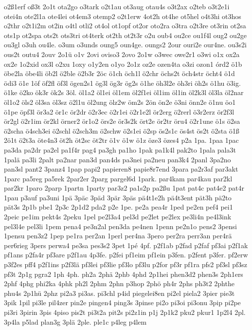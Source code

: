 {o2ß1erf
oß3t
2o1t
ota2go
o3tark
o2t1au
ot3aug
otau4s
o3t2ax
o2teb
o3t2e1i
otei4n
ote2l1a
ote4lei
ot4em3
otemp2
o2t1erw
4ot2h
ot4he
ot5hel
o4t3hi
ot3hos
o2thr
o2t1i2m
ot2in
o4tl
otli2
ot4ol
ot1opf
ot2or
oto2ra
o3tra
o2t3re
ot3rin
ot2sa
ots1p
ot2spa
ots2t
ots3tri
ot4terk
ot2th
ot2t3r
o2u
oub4
ou2ce
ou1f4l
oug2
ou2ge
ou3gl
o3uh
ou4le.
o3um
o3unds
oung5
oun4ge.
oungs2
2our
ouri2e
our4ne.
ou3s2i
ous2t
outu4
2ouv
2o1ü
o1v
2ovi
oviso3
2ovo
2o1w
o3wec
owe2r1
o3wi
o1x
ox2a
ox2e
1o2xid
ox3l
o2xu
1oxy
o1y2en
o1yo
2o1z
oz2e
ozen4ta
o3zi
ozon1
órd2
ö1b
öbe2la
öbe4li
öb2l
ö2ble
ö2b3r
2öc
ö1ch
öch1l
ö2chr
öchs2t
öch4str
öcht4
ö1d
ödi3
ö1e
1öf
öf2fl
öf3l
ögen2s1
ög3l
ög3r
ög2s
ö1he
öh3l2e
öh3ri
öh2s
ö1hu
ö3ig.
ö1ke
ö2ko
ök3r
ök2s
3öl.
öl1a2
öl1ei
öl1em
öl2f1ei
öl1im
öl1in
öl2k3l
öl3la
öl2nar
öl1o2
öls2
öl3sa
öl3sz
ö2l1u
öl2ung
ölz2w
öm2s
2ön
ön2e
ö3ni
önn2e
ö1nu
öo1
ö1pe
öpf3l
ör3a2
ör1c
ör2dr
ö2r3ec
ö2r1ei
ö2r1e2l
ör2erg
ö2rerl
ö3r2erz
ör2f3l
ör2gl
ö2r1im
ör2kl
örner2
ör1o2
örs2e
ör3s2k
ört2e
ör2tr
öru4
ö2r1une
ö1s
ö2sa
ö2scha
ö4sch3ei
ö2schl
ö2sch3m
ö2schw
ö2s1ei
ö2sp
ös2s1c
ös4st
ös2t
ö2sta
ö1ß
2ö1t
ö2t3a
öte4n3
öt2h
öt2sc
öt2tr
ö1v
ö1w
ö1z
öze3
özes4
p2a
1pa.
1paa
1pac
pa3da
pa2dr
pa2el
pa1f4r
pag4
pa3gh
pa1ho
1pak
pa1k4l
pak2to
1pala
pala3t
1palä
pa3li
2palt
pa2nar
pan3d
pan4ds
pa3nei
pa2neu
pan3k4
2panl
3pa2no
pan3sl
pant2
3panz4
1pap
papi2
papieren8
papie8r7end
3para
pa2r3af
par3akt
1parc
pa5reg
pa5rek
2par2er
2parg
pargel6d
1park.
par4kam
par4kau
par2kl
par2kr
1paro
2parp
1partn
1party
par3z2
pa1s2p
pa2ßu
1pat
pat4c
pat4e2
pat4r
1pau
p3auf
pa3uni
1pä
3päc
3päd
3pär
3päs
pä4t1e2h
pä4t3ent
pät3h
pä2to
pät3s
2p1b
pbe1
2p3c
2p1d2
pda2
p2e
1pe.
pe2a
pea4r
1ped
pe2en
pef4
pei1
2peic
pe1im
pekt4s
2peku
1pel
pe2l3a4
pel3d
pe2let
pe2lex
pe3li4n
pe4l3ink
pel3l4e
pel3li
1pem
pena4
pe3n2al
pen3da
pe4nen
1penn
pe2n1o
pens2
3pensi
1pensu
pen3z2
1pep
pe1ra
per2an
1perl
per4na
3pero
per2ra
perr3an
per4rä
per6rieg
3pers
perwa4
pe3sa
pes3s2
3pet
1pé
4pf.
p2f1ab
p2fad
p2faf
pf3ai
p2f1ak
pf1ans
p2fa4r
pf3are
p2f1au
4p3fe.
p2fei
pf1eim
pf1ein
p3fen.
p2fent
p3fer.
pf2erw
p3f2es
pff4
p2f1ins
p2f3lä
pf3lei
pf3lie
pf3lo
pf3lu
p2for
pf3r
pf1ra
pfs2
pf3sl
pf3sz
pf3t
2p1g
pgra2
1ph
4ph.
ph2a
2phä
2phb
4phd
2p1hei
phen3d2
phen3s
2ph1ers
2phf
4phg
phi2ka
4phk
ph2l
2phm
2phn
p3hop
2phö
ph4r
2phs
ph3t2
2phthe
phu4s
2p1hü
2phz
pi2a3
pi3as.
pi3chl
p4id
piegelei8en
pi2el
piela2
3pier
pie3t
3pik
1pil
pi3le
pil4zer
pin2e
pingen4
ping3s
3pinse
pi2o
pi3oi
pi3onu
3pip
pi2pe
pi3ri
3pirin
3pis
4piso
pis2t
pi3t2a
pit2s
pi2z1in
p1j
2p1k2
pku2
pkur1
1p2l4
2pl.
3p4la
p5lad
plan3g
3plä
2ple.
ple1c
p4leg
p4lem
}
